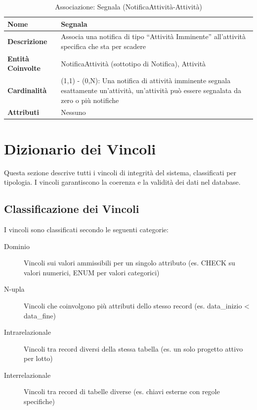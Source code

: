 \documentclass[12pt,a4paper]{article}
\begin{document}
\begin{table}[H]
\centering
\caption{Associazione: Segnala (NotificaAttività-Attività)}
\begin{tabularx}{\textwidth}{|l|X|}
\hline
\textbf{Nome} & Segnala \\
\hline
\textbf{Descrizione} & Associa una notifica di tipo ``Attività Imminente'' all'attività specifica che sta per scadere \\
\hline
\textbf{Entità Coinvolte} & NotificaAttività (sottotipo di Notifica), Attività \\
\hline
\textbf{Cardinalità} & (1,1) - (0,N): Una notifica di attività imminente segnala esattamente un'attività, un'attività può essere segnalata da zero o più notifiche \\
\hline
\textbf{Attributi} & Nessuno \\
\hline
\end{tabularx}
\end{table}

\newpage

\section{Dizionario dei Vincoli}

Questa sezione descrive tutti i vincoli di integrità del sistema, classificati per tipologia. I vincoli garantiscono la coerenza e la validità dei dati nel database.

\subsection{Classificazione dei Vincoli}

I vincoli sono classificati secondo le seguenti categorie:

\begin{description}
    \item[Dominio] Vincoli sui valori ammissibili per un singolo attributo (es. CHECK su valori numerici, ENUM per valori categorici)
    \item[N-upla] Vincoli che coinvolgono più attributi dello stesso record (es. data\_inizio < data\_fine)
    \item[Intrarelazionale] Vincoli tra record diversi della stessa tabella (es. un solo progetto attivo per lotto)
    \item[Interrelazionale] Vincoli tra record di tabelle diverse (es. chiavi esterne con regole specifiche)
\end{description}
\end{document}
